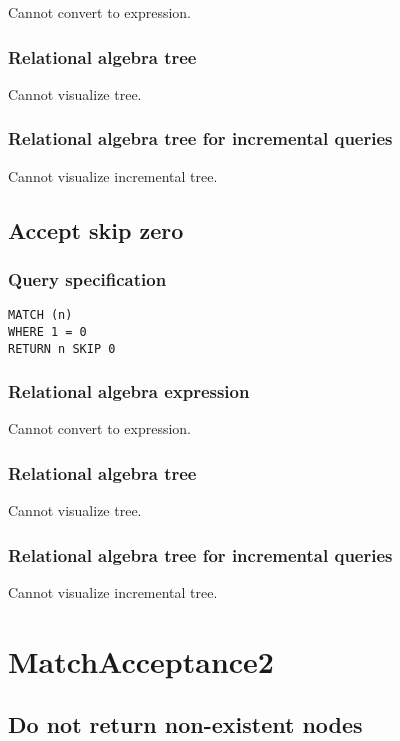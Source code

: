 Cannot convert to expression.

\subsubsection*{Relational algebra tree}

Cannot visualize tree.

\subsubsection*{Relational algebra tree for incremental queries}

Cannot visualize incremental tree.

\subsection{Accept skip zero}

\subsubsection*{Query specification}

\begin{lstlisting}
MATCH (n)
WHERE 1 = 0
RETURN n SKIP 0
\end{lstlisting}

\subsubsection*{Relational algebra expression}

Cannot convert to expression.

\subsubsection*{Relational algebra tree}

Cannot visualize tree.

\subsubsection*{Relational algebra tree for incremental queries}

Cannot visualize incremental tree.

\section{MatchAcceptance2}

\subsection{Do not return non-existent nodes}

